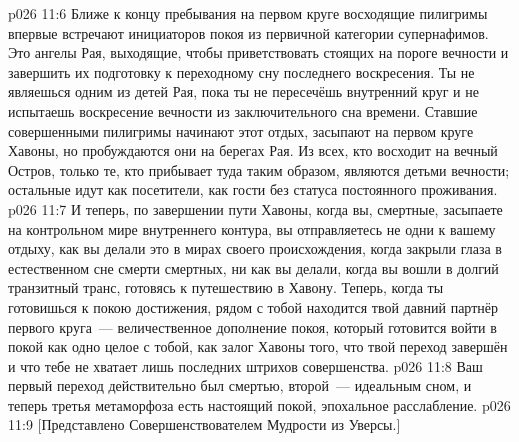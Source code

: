 \vs p026 11:6 \pc Ближе к концу пребывания на первом круге восходящие пилигримы впервые встречают инициаторов покоя из первичной категории супернафимов. Это ангелы Рая, выходящие, чтобы приветствовать стоящих на пороге вечности и завершить их подготовку к переходному сну последнего воскресения. Ты не являешься одним из детей Рая, пока ты не пересечёшь внутренний круг и не испытаешь воскресение вечности из заключительного сна времени. Ставшие совершенными пилигримы начинают этот отдых, засыпают на первом круге Хавоны, но пробуждаются они на берегах Рая. Из всех, кто восходит на вечный Остров, только те, кто прибывает туда таким образом, являются детьми вечности; остальные идут как посетители, как гости без статуса постоянного проживания.
\vs p026 11:7 И теперь, по завершении пути Хавоны, когда вы, смертные, засыпаете на контрольном мире внутреннего контура, вы отправляетесь не одни к вашему отдыху, как вы делали это в мирах своего происхождения, когда закрыли глаза в естественном сне смерти смертных, ни как вы делали, когда вы вошли в долгий транзитный транс, готовясь к путешествию в Хавону. Теперь, когда ты готовишься к покою достижения, рядом с тобой находится твой давний партнёр первого круга~--- величественное дополнение покоя, который готовится войти в покой как одно целое с тобой, как залог Хавоны того, что твой переход завершён и что тебе не хватает лишь последних штрихов совершенства.
\vs p026 11:8 Ваш первый переход действительно был смертью, второй~--- идеальным сном, и теперь третья метаморфоза есть настоящий покой, эпохальное расслабление.
\vsetoff
\vs p026 11:9 [Представлено Совершенствователем Мудрости из Уверсы.]
\quizlink
